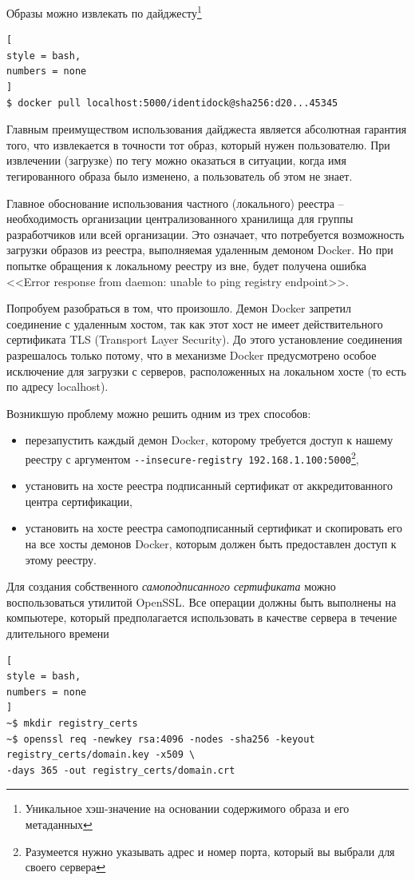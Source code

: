 \documentclass[%
	11pt,
	a4paper,
	utf8,
		]{article}
\begin{document}
Образы можно извлекать по дайджесту\footnote{Уникальное хэш-значение на основании содержимого образа и его метаданных}
\begin{lstlisting}[
style = bash,
numbers = none
]
$ docker pull localhost:5000/identidock@sha256:d20...45345
\end{lstlisting}

Главным преимуществом использования дайджеста является абсолютная гарантия того, что извлекается в точности тот образ, который нужен пользователю. При извлечении (загрузке) по тегу можно оказаться в ситуации, когда имя тегированного образа было изменено, а пользователь об этом не знает.

Главное обоснование использования частного (локального) реестра -- необходимость организации централизованного хранилища для группы разработчиков или всей организации. Это означает, что потребуется возможность загрузки образов из реестра, выполняемая удаленным демоном Docker. Но при попытке обращения к локальному реестру из вне, будет получена ошибка <<Error response from daemon: unable to ping registry endpoint>>.

Попробуем разобраться в том, что произошло. Демон Docker запретил соединение с удаленным хостом, так как этот хост не имеет действительного сертификата TLS (Transport Layer Security). До этого установление соединения разрешалось только потому, что в механизме Docker предусмотрено особое исключение для загрузки с серверов, расположенных на локальном хосте (то есть по адресу localhost).

Возникшую проблему можно решить одним из трех способов:
\begin{itemize}
	\item перезапустить каждый демон Docker, которому требуется доступ к нашему реестру с аргументом \verb|--insecure-registry 192.168.1.100:5000|\footnote{Разумеется нужно указывать адрес и номер порта, который вы выбрали для своего сервера},
	
	\item установить на хосте реестра подписанный сертификат от аккредитованного центра сертификации,
	
	\item установить на хосте реестра самоподписанный сертификат и скопировать его на все хосты демонов Docker, которым должен быть предоставлен доступ к этому реестру.
\end{itemize}

Для создания собственного \emph{самоподписанного сертификата} можно воспользоваться утилитой OpenSSL. Все операции должны быть выполнены на компьютере, который предполагается использовать в качестве сервера в течение длительного времени
\begin{lstlisting}[
style = bash,
numbers = none
]
~$ mkdir registry_certs
~$ openssl req -newkey rsa:4096 -nodes -sha256 -keyout registry_certs/domain.key -x509 \
-days 365 -out registry_certs/domain.crt
\end{lstlisting}
\end{document}
